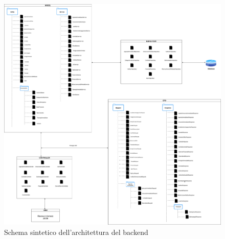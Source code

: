 \begin{figure}[H]
	\centering
	\includegraphics[width=0.7\linewidth]{Immagini/Schema backend.png}
	\caption[schema backend]{Schema sintetico dell'architettura del backend}
\end{figure}
